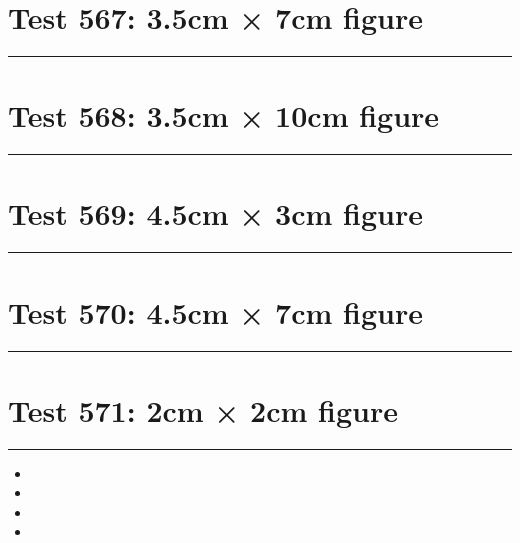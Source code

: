 \documentclass[a4paper,11pt]{article}
\begin{document}
\section*{Test 567: 3.5cm × 7cm figure}
\begin{swarmwrap}%
  \begin{minipage}[t]{3cm}
    \centering
    \rule{\linewidth}{7cm}
  \end{minipage}%
\end{swarmwrap}%
\swarmwrapnext
\lipsum[142]
\lipsum[143]
\lipsum[144]
\lipsum[145]
\lipsum[146]
\lipsum[147]
\section*{Test 568: 3.5cm × 10cm figure}
\begin{swarmwrap}%
  \begin{minipage}[t]{3cm}
    \centering
    \rule{\linewidth}{10cm}
  \end{minipage}%
\end{swarmwrap}%
\swarmwrapnext
\lipsum[65]
\lipsum[66]
\lipsum[67]
\lipsum[68]
\section*{Test 569: 4.5cm × 3cm figure}
\begin{swarmwrap}%
  \begin{minipage}[t]{4cm}
    \centering
    \rule{\linewidth}{3cm}
  \end{minipage}%
\end{swarmwrap}%
\swarmwrapnext
\lipsum[137]
\lipsum[138]
\lipsum[139]
\lipsum[140]
\lipsum[141]
\lipsum[142]
\section*{Test 570: 4.5cm × 7cm figure}
\begin{swarmwrap}%
  \begin{minipage}[t]{4cm}
    \centering
    \rule{\linewidth}{7cm}
  \end{minipage}%
\end{swarmwrap}%
\swarmwrapnext
\lipsum[146]
\lipsum[147]
\lipsum[148]
\section*{Test 571: 2cm × 2cm figure}
\begin{swarmwrap}%
  \begin{minipage}[t]{2cm}
    \centering
    \rule{\linewidth}{2cm}
  \end{minipage}%
\end{swarmwrap}
\begin{itemize}
  \item \swarmwrapnext\lipsum[147][1-4]
  \item \lipsum[149][1-3]
  \item \lipsum[150][1-3]
  \item \lipsum[1][1-3]
\end{itemize}
\end{document}
